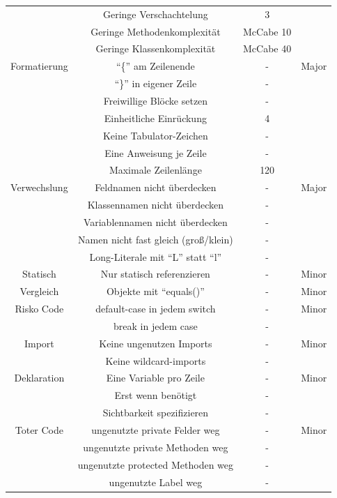 \documentclass[da,ngerman]{stthesis}
\begin{document}
\begin{center}
\begin{longtabu}{|c|c|c|c|}
  						& Geringe Verschachtelung & 3 & \\
  						& Geringe Methodenkomplexität & McCabe 10 & \\
  						& Geringe Klassenkomplexität & McCabe 40 & \\
  						\hline 
  						Formatierung & "`\{"' am Zeilenende & - & Major \\
  						& "`\}"' in eigener Zeile & - & \\
  						& Freiwillige Blöcke setzen & - & \\
  						& Einheitliche Einrückung & 4 & \\
  						& Keine Tabulator-Zeichen & - & \\
  						& Eine Anweisung je Zeile & - & \\
  						& Maximale Zeilenlänge & 120 & \\
  						\hline
  						Verwechslung & Feldnamen nicht überdecken & - & Major \\
  						& Klassennamen nicht überdecken & - & \\
  						& Variablennamen nicht überdecken & - & \\
  						& Namen nicht fast gleich (groß/klein) & - & \\
  						& Long-Literale mit "`L"' statt "`l"' & - & \\
  						\hline
  						Statisch & Nur statisch referenzieren & - & Minor \\
  						\hline
  						Vergleich & Objekte mit "`equals()"' & - & Minor \\
  						\hline
  						Risko Code & default-case in jedem switch & - & Minor \\
  						& break in jedem case & - & \\
  						\hline
  						Import & Keine ungenutzen Imports & - & Minor \\
  						& Keine wildcard-imports & - & \\
  						\hline
  						Deklaration & Eine Variable pro Zeile & - & Minor \\
  						& Erst wenn benötigt & - & \\
  						& Sichtbarkeit spezifizieren & - & \\
  						\hline
  						Toter Code & ungenutzte private Felder weg & - & Minor \\
  						& ungenutzte private Methoden weg & - & \\
  						& ungenutzte protected Methoden weg & - & \\ 
  						& ungenutzte Label weg & - & \\

\end{longtabu}
\end{center}
\end{document}
